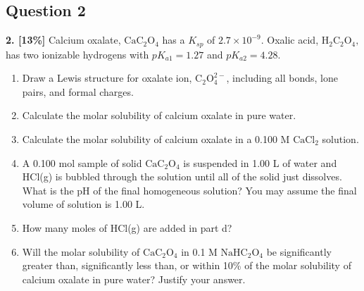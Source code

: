 \documentclass[10pt,a4paper]{article}
\begin{document}
\subsection*{Question 2}
\textbf{2. [13\%]} Calcium oxalate, $\text{CaC}_2\text{O}_4$ has a $K_{sp}$ of $2.7\times10^{-9}.$ Oxalic acid, $\text{H}_2\text{C}_2\text{O}_4,$ has two ionizable hydrogens with $pK_{a1}= 1.27$ and $pK_{a2}=4.28.$
\begin{enumerate}[label=\alph*.]
    \vspace{5cm} \item Draw a Lewis structure for oxalate ion, $\text{C}_2\text{O}_4^{2-}$, including all bonds, lone pairs, and formal charges.
    \vspace{5cm} \item Calculate the molar solubility of calcium oxalate in pure water.
    \vspace{5cm} \item Calculate the molar solubility of calcium oxalate in a 0.100 M $\text{CaCl}_2$ solution.
    \vspace{5cm} \item A 0.100 mol sample of solid $\text{CaC}_2\text{O}_4$ is suspended in 1.00 L of water and HCl(g) is bubbled through the solution until all of the solid just dissolves. What is the pH of the final homogeneous solution? You may assume the final volume of solution is 1.00 L.
    \vspace{5cm} \item How many moles of HCl(g) are added in part d?
    \vspace{5cm} \item Will the molar solubility of $\text{CaC}_2\text{O}_4$ in 0.1 M $\text{NaHC}_2\text{O}_4$ be significantly greater than, significantly less than, or within 10\% of the molar solubility of calcium oxalate in pure water? Justify your answer.
\end{enumerate}
\end{document}

